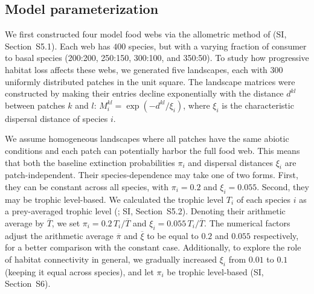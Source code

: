 \documentclass[11pt]{article}
\newcommand{\SI}{SI}
\begin{document}
\subsection{Model parameterization}

We first constructed four model food webs via the allometric method of \citet{Schneider2016} (\SI, Section~S5.1). Each web has $400$ species, but with a varying fraction of consumer to basal species (200:200, 250:150, 300:100, and 350:50). To study how progressive habitat loss affects these webs, we generated five landscapes, each with $300$ uniformly distributed patches in the unit square. The landscape matrices were constructed by making their entries decline exponentially with the distance $d^{kl}$ between patches $k$ and $l$: $M_i^{kl} = \exp(-d^{kl} / \xi_i)$, where $\xi_i$ is the characteristic dispersal distance of species $i$.

We assume homogeneous landscapes where all patches have the same abiotic conditions and each patch can potentially harbor the full food web. This means that both the baseline extinction probabilities $\pi_i$ and dispersal distances $\xi_i$ are patch-independent. Their species-dependence may take one of two forms. First, they can be constant across all species, with $\pi_i = 0.2$ and $\xi_i = 0.055$. Second, they may be trophic level-based. We calculated the trophic level $T_i$ of each species $i$  as a prey-averaged trophic level (\citealp{WilliamsMartinez2004}; \SI, Section~S5.2). Denoting their arithmetic average by $\overline{T}$, we set $\pi_i = 0.2 \, T_i / \overline{T}$ and $\xi_i = 0.055 \, T_i / \overline{T}$. The numerical factors adjust the arithmetic average $\overline{\pi}$ and $\overline{\xi}$ to be equal to $0.2$ and $0.055$ respectively, for a better comparison with the constant case. Additionally, to explore the role of habitat connectivity in general, we gradually increased $\xi_i$ from $0.01$ to $0.1$ (keeping it equal across species), and let $\pi_i$ be trophic level-based (\SI, Section~S6).
\end{document}
